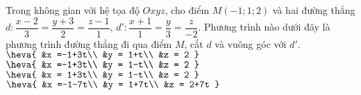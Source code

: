 \begin{ex}%
	Trong không gian với hệ tọa độ $Oxyz$, cho điểm $M\left(-1;1;2\right)$ và hai đường thẳng $d\colon \dfrac{x-2}{3} = \dfrac{y+3}{2} = \dfrac{z-1}{1}$, $d'\colon \dfrac{x+1}{1} = \dfrac{y}{3} = \dfrac{z}{-2}$. Phương trình nào dưới đây là phương trình đường thẳng đi qua điểm $M$, cắt $d$ và vuông góc với $d'$.
	\choice
	{$\heva{
	&x =-1+3t\\
	&y = 1+t\\
	&z = 2
	}$}
	{\True$\heva{
	&x =-1+3t\\
	&y = 1-t\\
	&z = 2
	}$}
	{$ \heva{
	&x = 1+3t\\
	&y = 1-t\\
	&z = 2
	}$}
	{$ \heva{
	&x =-1-7t\\
	&y = 1+7t\\
	&z = 2+7t
	}$}
\end{ex}
